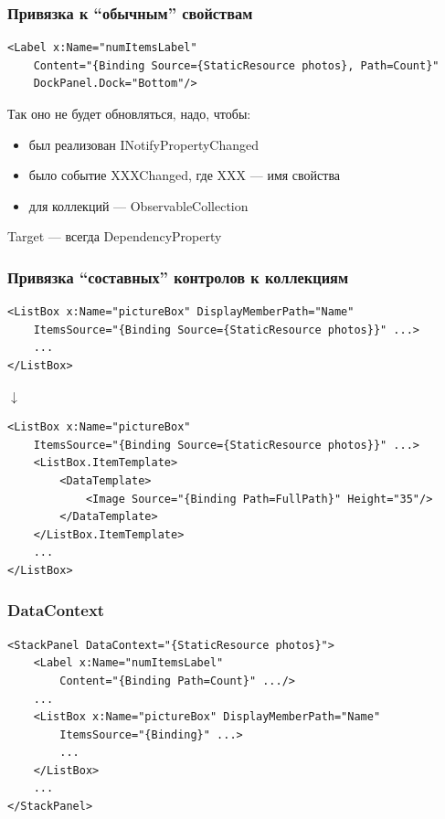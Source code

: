 \documentclass[xetex,mathserif,serif]{beamer}
\newcommand{\DownArrow} {
    \hspace{2cm}\begin{LARGE}$\downarrow$\end{LARGE}
}
\begin{document}
    \begin{frame}[fragile]
        \frametitle{Привязка к ``обычным'' свойствам}
        \begin{footnotesize}
            \begin{verbatim}
<Label x:Name="numItemsLabel"
    Content="{Binding Source={StaticResource photos}, Path=Count}"
    DockPanel.Dock="Bottom"/>
            \end{verbatim}
        \end{footnotesize}
        Так оно не будет обновляться, надо, чтобы:
        \begin{itemize}
            \item был реализован INotifyPropertyChanged
            \item было событие XXXChanged, где XXX --- имя свойства
            \item для коллекций --- ObservableCollection
        \end{itemize}
        Target --- всегда DependencyProperty
    \end{frame}

    \begin{frame}[fragile]
        \frametitle{Привязка ``составных'' контролов к коллекциям}
        \begin{footnotesize}
            \begin{verbatim}
<ListBox x:Name="pictureBox" DisplayMemberPath="Name"
    ItemsSource="{Binding Source={StaticResource photos}}" ...>
    ...
</ListBox>
            \end{verbatim}
        \end{footnotesize}
        \DownArrow
        \begin{footnotesize}
            \begin{verbatim}
<ListBox x:Name="pictureBox"
    ItemsSource="{Binding Source={StaticResource photos}}" ...>
    <ListBox.ItemTemplate>
        <DataTemplate>
            <Image Source="{Binding Path=FullPath}" Height="35"/>
        </DataTemplate>
    </ListBox.ItemTemplate>
    ...
</ListBox>
            \end{verbatim}
        \end{footnotesize}
    \end{frame}

    \begin{frame}[fragile]
        \frametitle{DataContext}
        \begin{footnotesize}
            \begin{verbatim}
<StackPanel DataContext="{StaticResource photos}">
    <Label x:Name="numItemsLabel"
        Content="{Binding Path=Count}" .../>
    ...
    <ListBox x:Name="pictureBox" DisplayMemberPath="Name"
        ItemsSource="{Binding}" ...>
        ...
    </ListBox>
    ...
</StackPanel>
            \end{verbatim}
        \end{footnotesize}
    \end{frame}
\end{document}
